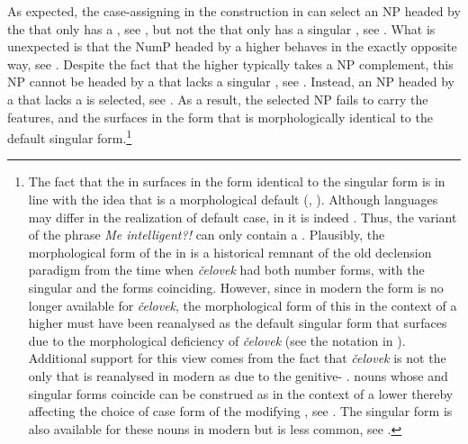 \documentclass[output=paper,modfonts,newtxmath,hidelinks]{langscibook}
\begin{document}
As expected, the case-assigning  in the  construction in  can select an NP headed by the  that only has a  , see , but not the  that only has a singular , see . What is unexpected is that the NumP headed by a higher  behaves in the exactly opposite way, see . Despite the fact that the higher  typically takes a  NP complement, this NP cannot be headed by a  that lacks a singular , see . Instead, an NP headed by a  that lacks a   is selected, see . As a result, the selected NP fails to carry the   features, and the  surfaces in the form that is morphologically identical to the default  singular form.\footnote{\label{18:fn3}The fact that the  in  surfaces in the form identical to the  singular form is in line with the idea that  is a morphological default (\citealt{Marantz1991}, \citealt{Schütze1997, Schütze2001}). Although languages may differ in the realization of default case, in  it is indeed . Thus, the  variant of the  phrase \textit{Me intelligent?!} can only contain a  . Plausibly, the morphological form of the  in  is a historical remnant of the old declension paradigm from the time when \textit{čelovek} had both number forms, with the  singular and the   forms coinciding. However, since in modern  the  form is no longer available for \textit{čelovek}, the morphological form of this  in the context of a higher  must have been reanalysed as the default  singular form that surfaces due to the morphological deficiency of \textit{čelovek} (see the notation in ).   Additional support for this view comes from the fact that \textit{čelovek} is not the only  that is reanalysed in modern  as  due to the genitive- .   nouns whose   and  singular forms coincide can be construed as   in the context of a lower  thereby affecting the choice of case form of the modifying , see . The  singular form is also available for these nouns in modern  but is less common, see .

}
\end{document}
